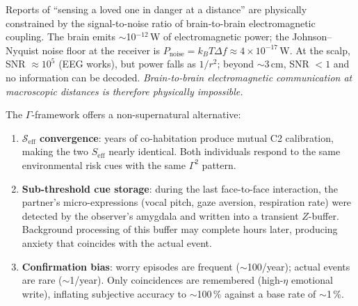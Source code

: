\documentclass[aps,pre,twocolumn,superscriptaddress,floatfix]{revtex4-2}
\begin{document}
\begin{remark}
\label{rem:remote-sensing}
Reports of ``sensing a loved one in danger at a
distance'' are physically constrained by the
signal-to-noise ratio of brain-to-brain electromagnetic
coupling.
The brain emits $\sim$10$^{-12}$\,W of electromagnetic
power; the Johnson--Nyquist noise floor at the
receiver is $P_{\text{noise}} = k_B T \Delta f \approx
4 \times 10^{-17}$\,W.
At the scalp, SNR $\approx 10^5$ (EEG works), but
power falls as $1/r^2$; beyond $\sim$3\,cm,
SNR $< 1$ and no information can be decoded.
\emph{Brain-to-brain electromagnetic communication
at macroscopic distances is therefore physically
impossible.}

The $\Gamma$-framework offers a non-supernatural
alternative:
\begin{enumerate}
  \item \textbf{$\mathcal{S}_{\text{eff}}$ convergence}:
    years of co-habitation produce mutual C2
    calibration, making the two $S_{\text{eff}}$
    nearly identical.
    Both individuals respond to the same environmental
    risk cues with the same $\Gamma^2$ pattern.
  \item \textbf{Sub-threshold cue storage}:
    during the last face-to-face interaction, the
    partner's micro-expressions (vocal pitch, gaze
    aversion, respiration rate) were detected by
    the observer's amygdala and written into
    a transient $Z$-buffer.
    Background processing of this buffer may complete
    hours later, producing anxiety that coincides
    with the actual event.
  \item \textbf{Confirmation bias}:
    worry episodes are frequent ($\sim$100/year);
    actual events are rare ($\sim$1/year).
    Only coincidences are remembered (high-$\eta$
    emotional write), inflating subjective
    accuracy to $\sim$100\,\% against a base
    rate of $\sim$1\,\%.
\end{enumerate}
\end{remark}
\end{document}

